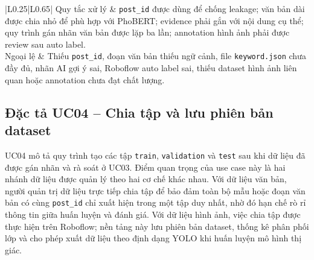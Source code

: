 \begin{longtable}{|L{0.25\textwidth}|L{0.65\textwidth}|}
Quy tắc xử lý & \texttt{post\_id} được dùng để chống leakage; văn bản dài được chia nhỏ để phù hợp với PhoBERT; evidence phải gắn với nội dung cụ thể; quy trình gán nhãn văn bản được lặp ba lần; annotation hình ảnh phải được review sau auto label. \\ \hline
Ngoại lệ & Thiếu \texttt{post\_id}, đoạn văn bản thiếu ngữ cảnh, file \texttt{keyword.json} chưa đầy đủ, nhãn AI gợi ý sai, Roboflow auto label sai, thiếu dataset hình ảnh liên quan hoặc annotation chưa đạt chất lượng. \\ \hline
\end{longtable}

\subsection{Đặc tả UC04 -- Chia tập và lưu phiên bản dataset}
UC04 mô tả quy trình tạo các tập \texttt{train}, \texttt{validation} và \texttt{test} sau khi dữ liệu đã được gán nhãn và rà soát ở UC03. Điểm quan trọng của use case này là hai nhánh dữ liệu được quản lý theo hai cơ chế khác nhau. Với dữ liệu văn bản, người quản trị dữ liệu trực tiếp chia tập để bảo đảm toàn bộ mẫu hoặc đoạn văn bản có cùng \texttt{post\_id} chỉ xuất hiện trong một tập duy nhất, nhờ đó hạn chế rò rỉ thông tin giữa huấn luyện và đánh giá. Với dữ liệu hình ảnh, việc chia tập được thực hiện trên Roboflow; nền tảng này lưu phiên bản dataset, thống kê phân phối lớp và cho phép xuất dữ liệu theo định dạng YOLO khi huấn luyện mô hình thị giác.

